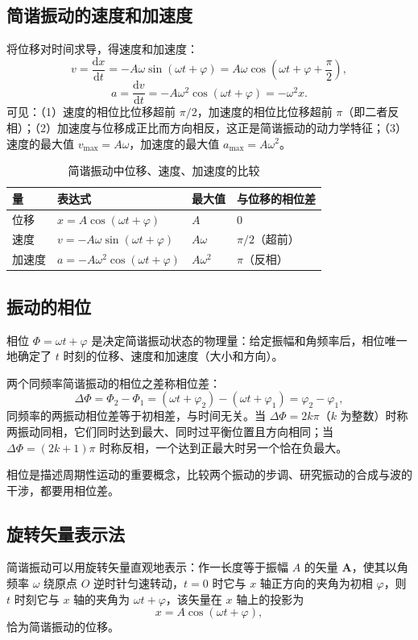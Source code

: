     \subsection{简谐振动的速度和加速度}
    将位移对时间求导，得速度和加速度：
    \[
    v=\frac{\mathrm{d}x}{\mathrm{d}t}=-A\omega\sin(\omega t+\varphi)=A\omega\cos\left(\omega t+\varphi+\frac{\pi}{2}\right),
    \]
    \[
    a=\frac{\mathrm{d}v}{\mathrm{d}t}=-A\omega^{2}\cos(\omega t+\varphi)=-\omega^{2}x.
    \]
    可见：（1）速度的相位比位移超前 $\pi/2$，加速度的相位比位移超前 $\pi$（即二者反相）；（2）加速度与位移成正比而方向相反，这正是简谐振动的动力学特征；（3）速度的最大值 $v_{\max}=A\omega$，加速度的最大值 $a_{\max}=A\omega^{2}$。

    \begin{table}[htbp]
    \centering
    \caption{简谐振动中位移、速度、加速度的比较}
    \begin{tabular}{llll}
    \toprule
    量 & 表达式 & 最大值 & 与位移的相位差 \\
    \midrule
    位移 & $x=A\cos(\omega t+\varphi)$ & $A$ & $0$ \\
    速度 & $v=-A\omega\sin(\omega t+\varphi)$ & $A\omega$ & $\pi/2$（超前） \\
    加速度 & $a=-A\omega^{2}\cos(\omega t+\varphi)$ & $A\omega^{2}$ & $\pi$（反相） \\
    \bottomrule
    \end{tabular}
    \end{table}

    \subsection{振动的相位}
    相位 $\Phi=\omega t+\varphi$ 是决定简谐振动状态的物理量：给定振幅和角频率后，相位唯一地确定了 $t$ 时刻的位移、速度和加速度（大小和方向）。

    两个同频率简谐振动的相位之差称相位差：
    \[
    \Delta\Phi=\Phi_2-\Phi_1=(\omega t+\varphi_2)-(\omega t+\varphi_1)=\varphi_2-\varphi_1,
    \]
    同频率的两振动相位差等于初相差，与时间无关。当 $\Delta\Phi=2k\pi$（$k$ 为整数）时称两振动同相，它们同时达到最大、同时过平衡位置且方向相同；当 $\Delta\Phi=(2k+1)\pi$ 时称反相，一个达到正最大时另一个恰在负最大。

    相位是描述周期性运动的重要概念，比较两个振动的步调、研究振动的合成与波的干涉，都要用相位差。

    \subsection{旋转矢量表示法}
    简谐振动可以用旋转矢量直观地表示：作一长度等于振幅 $A$ 的矢量 $\boldsymbol{A}$，使其以角频率 $\omega$ 绕原点 $O$ 逆时针匀速转动，$t=0$ 时它与 $x$ 轴正方向的夹角为初相 $\varphi$，则 $t$ 时刻它与 $x$ 轴的夹角为 $\omega t+\varphi$，该矢量在 $x$ 轴上的投影为
    \[
    x=A\cos(\omega t+\varphi),
    \]
    恰为简谐振动的位移。

